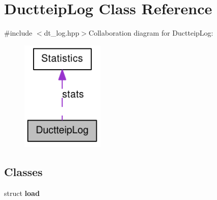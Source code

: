 \hypertarget{class_ductteip_log}{
\section{DuctteipLog Class Reference}
\label{class_ductteip_log}
}


{\ttfamily \#include $<$dt\_\-log.hpp$>$}Collaboration diagram for DuctteipLog:\nopagebreak
\begin{figure}[H]
\begin{center}
\leavevmode
\includegraphics[width=112pt]{class_ductteip_log__coll__graph}
\end{center}
\end{figure}
\subsection*{Classes}
\begin{DoxyCompactItemize}
\item 
struct {\bfseries load}
\end{DoxyCompactItemize}
